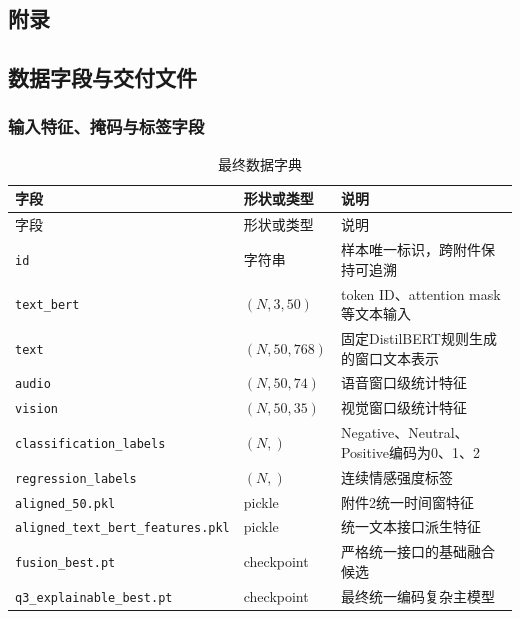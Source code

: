 \documentclass{gmcmthesis}
\newcommand{\code}[1]{\texttt{#1}}
\begin{document}
\clearpage


\begin{appendices}
\clearpage
\section*{附录}
\setcounter{subsection}{0}
\setcounter{subsubsection}{0}
\renewcommand{\thesubsection}{\Alph{subsection}}
\renewcommand{\thesubsubsection}{\thesubsection\thinskip.\thinskip\arabic{subsubsection}}
\subsection{数据字段与交付文件}
\subsubsection{输入特征、掩码与标签字段}
\begingroup
\small
\begin{longtable}{C{0.27\textwidth}C{0.18\textwidth}C{0.43\textwidth}}
\caption{最终数据字典}\label{tab:data_dictionary}\\
\toprule 字段 & 形状或类型 & 说明 \\
\midrule
\endfirsthead
\toprule 字段 & 形状或类型 & 说明 \\
\midrule
\endhead
\code{id} & 字符串 & 样本唯一标识，跨附件保持可追溯 \\
\code{text\_bert} & $(N,3,50)$ & token ID、attention mask等文本输入 \\
\code{text} & $(N,50,768)$ & 固定DistilBERT规则生成的窗口文本表示 \\
\code{audio} & $(N,50,74)$ & 语音窗口级统计特征 \\
\code{vision} & $(N,50,35)$ & 视觉窗口级统计特征 \\
\code{classification\_\allowbreak labels} & $(N,)$ & Negative、Neutral、Positive编码为0、1、2 \\
\code{regression\_\allowbreak labels} & $(N,)$ & 连续情感强度标签 \\
\code{aligned\_50.\allowbreak pkl} & pickle & 附件2统一时间窗特征 \\
\code{aligned\_text\_bert\_\allowbreak features.pkl} & pickle & 统一文本接口派生特征 \\
\code{fusion\_best.pt} & checkpoint & 严格统一接口的基础融合候选 \\
\code{q3\_explainable\_\allowbreak best.pt} & checkpoint & 最终统一编码复杂主模型 \\
\bottomrule
\end{longtable}
\endgroup

\end{appendices}
\end{document}

